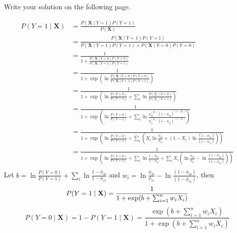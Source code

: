\documentclass[12pt]{article}
\newcommand{\Xv}{\mathbf{X}}
\begin{document}
\begin{enumerate}
\begin{enumerate}
    Write your solution on the following page.
\end{enumerate}
\clearpage
    \begin{tcolorbox}[fit,height=22cm, blank, borderline={1pt}{-2pt},nobeforeafter]
    \begin{equation}\nonumber
    \begin{aligned}
    P(Y = 1\mid\Xv)
    &= \frac{P(\Xv\mid Y = 1)P(Y = 1)}{P(\Xv)}\\
    &= \frac{P(\Xv\mid Y = 1)P(Y = 1)}{P(\Xv\mid Y = 1)P(Y = 1) + P(\Xv\mid Y = 0)P(Y = 0)}\\
    &= \frac{1}{1 + \frac{P(\Xv\mid Y = 0)P(Y = 0)}{P(\Xv\mid Y = 1)P(Y = 1)}}\\
    &= \frac{1}{1 + \exp(\ln\frac{P(\Xv\mid Y = 0)P(Y = 0)}{P(\Xv\mid Y = 1)P(Y = 1)})}\\
    &= \frac{1}{1 + \exp(\ln\frac{P(Y = 0)}{P(Y = 1)} + \sum_{i}\ln\frac{P(X_{i}\mid Y = 0)}{P(X_{i}\mid Y = 1)})}\\
    &= \frac{1}{1 + \exp(\ln\frac{P(Y = 0)}{P(Y = 1)} + \sum_{i}\ln\frac{\phi_{i0}^{(X_i)}(1-\phi_{i0})^{(1-X_i)}}{\phi_{i1}^{(X_i)}(1-\phi_{i1})^{(1-X_i)}})}\\
    &= \frac{1}{1 + \exp(\ln\frac{P(Y = 0)}{P(Y = 1)} + \sum_i(X_i\ln{\frac{\phi_{i0}}{\phi_{i1}}} + (1-X_i)\ln\frac{(1-\phi_{i0})}{(1-\phi_{i1})}))}\\
    &= \frac{1}{1 + \exp(\ln\frac{P(Y = 0)}{P(Y = 1)} + \sum_i\ln{\frac{1-\phi_{i0}}{1-\phi_{i1}}}+ \sum_iX_i(\ln{\frac{\phi_{i0}}{\phi_{i1}}} - \ln\frac{(1-\phi_{i0})}{(1-\phi_{i1})}))}\\
    \end{aligned}
    \end{equation}
    Let $b = \ln\frac{P(Y = 0)}{P(Y = 1)} + \sum_i\ln{\frac{1-\phi_{i0}}{1-\phi_{i1}}}$ and $w_i = \ln{\frac{\phi_{i0}}{\phi_{i1}}} - \ln\frac{(1-\phi_{i0})}{(1-\phi_{i1})}$, then
    \begin{equation}\nonumber
    P(Y=1\mid\Xv)=\frac{1}{1+\exp(b+\sum_{i=1}^{n} w_iX_i)}\\
    \end{equation}
    \begin{equation}\nonumber
    P(Y=0\mid\Xv)=1 - P(Y=1\mid\Xv) = \frac{\exp(b+\sum_{i=1}^{n} w_iX_i)}{1+\exp(b+\sum_{i=1}^{n} w_iX_i)}
    \end{equation}
    \end{tcolorbox}


\end{enumerate}
\end{document}
